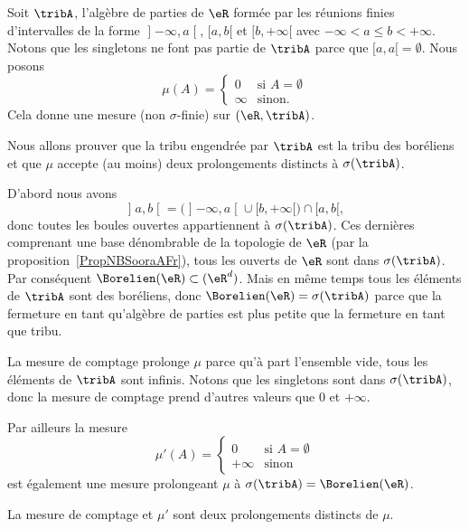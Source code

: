 \begin{example} \label{ExKCEoolsZrL}
	Soit \( \tribA\), l'algèbre de parties de \( \eR\) formée par les réunions finies d'intervalles de la forme \( \mathopen] -\infty , a \mathclose[\), \( \mathopen[ a , b [\) et \( \mathopen[ b , +\infty [\) avec \( -\infty<a\leq b<+\infty\). Notons que les singletons ne font pas partie de \( \tribA\) parce que \( \mathopen[ a ,a[=\emptyset\). Nous posons
	\begin{equation}
		\mu(A)=\begin{cases}
			0      & \text{si } A=\emptyset \\
			\infty & \text{sinon}.
		\end{cases}
	\end{equation}
	Cela donne une mesure (non \( \sigma\)-finie) sur \( (\eR,\tribA)\).

	Nous allons prouver que la tribu engendrée par \( \tribA\) est la tribu des boréliens et que \( \mu\) accepte (au moins) deux prolongements distincts à \( \sigma(\tribA)\).

	D'abord nous avons
	\begin{equation}
		\mathopen] a , b \mathclose[=\big( \mathopen] -\infty , a \mathclose[\cup \mathopen[ b , +\infty [ \big)\cap\mathopen[ a , b [,
	\end{equation}
	donc toutes les boules ouvertes appartiennent à \( \sigma(\tribA)\). Ces dernières comprenant une base dénombrable de la topologie de \( \eR\) (par la proposition~\ref{PropNBSooraAFr}), tous les ouverts de \( \eR\) sont dans \( \sigma(\tribA)\). Par conséquent \( \Borelien(\eR)\subset(\eR^d)\). Mais en même temps tous les éléments de \( \tribA\) sont des boréliens, donc \( \Borelien(\eR)=\sigma(\tribA)\) parce que la fermeture en tant qu'algèbre de parties est plus petite que la fermeture en tant que tribu.

	La mesure de comptage prolonge \( \mu\) parce qu'à part l'ensemble vide, tous les éléments de \( \tribA\) sont infinis. Notons que les singletons sont dans \( \sigma(\tribA)\), donc la mesure de comptage prend d'autres valeurs que \( 0\) et \( +\infty\).

	Par ailleurs la mesure
	\begin{equation}
		\mu'(A)=\begin{cases}
			0       & \text{si } A=\emptyset \\
			+\infty & \text{sinon}
		\end{cases}
	\end{equation}
	est également une mesure prolongeant \( \mu\) à \( \sigma(\tribA)=\Borelien(\eR)\).

	La mesure de comptage et \( \mu'\) sont deux prolongements distincts de \( \mu\).
\end{example}

